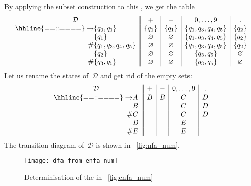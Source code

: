 By applying the subset construction to this \eNFA, we get the table
\begin{equation*}
\begin{array}{r@{}l||c|c|c|c}
\multicolumn{2}{c||}{\mathcal{D}} & + & - & 0, \ldots, 9 & \mathtt{.}\\
\hhline{==::====}
\rightarrow
   & \{q_0,q_1\}
             & \{q_1\} & \{q_1\} & \{q_1, q_3, q_4, q_5\} & \{q_2\}\\
   & \{q_1\} & \varnothing  & \varnothing & \{q_1, q_3, q_4, q_5\}
             & \{q_2\}\\
\# & \{q_1, q_3, q_4, q_5\}
             & \varnothing  & \varnothing & \{q_1, q_3, q_4, q_5\}
             & \{q_2\}\\
   & \{q_2\} & \varnothing & \varnothing & \{q_3, q_5\} & \varnothing\\
\# & \{q_3, q_5\}
             & \varnothing & \varnothing & \{q_3, q_5\} & \varnothing
\end{array}
\end{equation*}
Let us rename the states of~\(\mathcal{D}\) and get rid of the empty
sets:
\begin{equation*}
\begin{array}{r@{}l||c|c|c|c}
\multicolumn{2}{c||}{\mathcal{D}} & + & - & 0, \ldots, 9 & \mathtt{.}\\
\hhline{==::====}
\rightarrow
   & A & B & B & C & D\\
   & B &   &   & C & D\\
\# & C &   &   & C & D\\
   & D &   &   & E &\\
\# & E &   &   & E &
\end{array}
\end{equation*}
The transition diagram of~\(\mathcal{D}\) is shown in
\fig~\vref{fig:nfa_num}.
\begin{figure}[H]
\centering
\texttt{[image: dfa\_from\_enfa\_num]}
\caption{Determinisation of the \eNFA in \fig~\vref{fig:enfa_num}}
\label{fig:nfa_num}
\end{figure}
